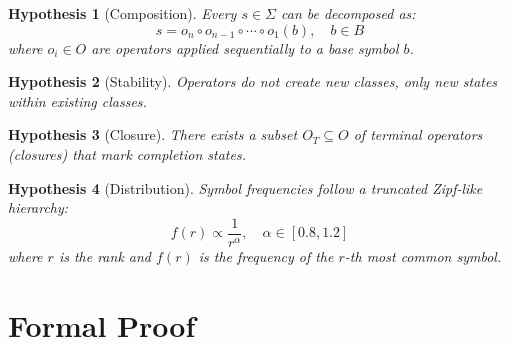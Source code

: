 \documentclass[12pt,a4paper]{article}
\newtheorem{hypothesis}{Hypothesis}
\begin{document}
\begin{hypothesis}[Composition]
Every $s \in \Sigma$ can be decomposed as:
\[
s = o_n \circ o_{n-1} \circ \cdots \circ o_1(b), \quad b \in B
\]
where $o_i \in O$ are operators applied sequentially to a base symbol $b$.
\end{hypothesis}

\begin{hypothesis}[Stability]
Operators do not create new classes, only new states within existing classes.
\end{hypothesis}

\begin{hypothesis}[Closure]
There exists a subset $O_T \subseteq O$ of terminal operators (closures) that mark completion states.
\end{hypothesis}

\begin{hypothesis}[Distribution]
Symbol frequencies follow a truncated Zipf-like hierarchy:
\[
f(r) \propto \frac{1}{r^\alpha}, \quad \alpha \in [0.8, 1.2]
\]
where $r$ is the rank and $f(r)$ is the frequency of the $r$-th most common symbol.
\end{hypothesis}

\section{Formal Proof}
\end{document}
